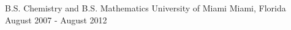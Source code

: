 

\begin{cventries}

  \cventry
    {B.S. Chemistry and B.S. Mathematics} %
    {University of Miami} %
    {Miami, Florida} %
    {August 2007 - August 2012} %
    {}

\end{cventries}
